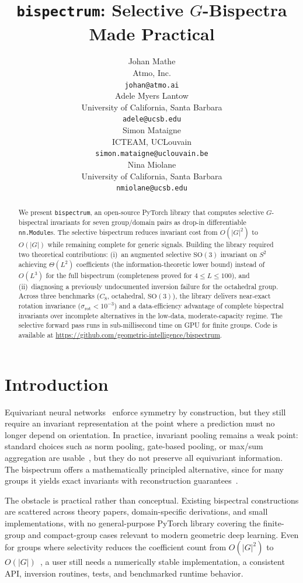 \documentclass{article}
\title{\texttt{bispectrum}: Selective $G$-Bispectra Made Practical}
\author{%
  Johan Mathe \\
  Atmo, Inc. \\
  \texttt{johan@atmo.ai} \\
  \And
  Adele Myers Lantow \\
  University of California, Santa Barbara \\
  \texttt{adele@ucsb.edu} \\
  \And
  Simon Mataigne \\
  ICTEAM, UCLouvain \\
  \texttt{simon.mataigne@uclouvain.be} \\
  \And
  Nina Miolane \\
  University of California, Santa Barbara \\
  \texttt{nmiolane@ucsb.edu} \\
}
\theoremstyle{definition}
\theoremstyle{remark}
\newcommand{\SO}{\mathrm{SO}}
\theoremstyle{definition}
\begin{document}
\maketitle

\begin{abstract}
We present \texttt{bispectrum}, an open-source PyTorch library that computes
selective $G$-bispectral invariants for seven group/domain pairs as
drop-in differentiable \texttt{nn.Module}s.
The selective bispectrum reduces invariant cost from $O(|G|^2)$ to $O(|G|)$
while remaining complete for generic signals.
Building the library required two theoretical contributions:
(i)~an augmented selective $\SO(3)$ invariant on $S^2$ achieving
$\Theta(L^2)$ coefficients (the information-theoretic lower
bound) instead of $O(L^3)$ for the full bispectrum
(completeness proved for $4 \le L \le 100$), and
(ii)~diagnosing a previously undocumented inversion failure for the
octahedral group.
Across three benchmarks ($C_8$, octahedral, $\SO(3)$), the library
delivers near-exact rotation invariance
($\sigma_{\mathrm{rot}} < 10^{-3}$) and a data-efficiency advantage of
complete bispectral invariants over incomplete alternatives in the
low-data, moderate-capacity regime.
The selective forward pass runs in sub-millisecond time on GPU for finite
groups. Code is available at \url{https://github.com/geometric-intelligence/bispectrum}.
\end{abstract}
\section{Introduction}
\label{sec:intro}

Equivariant neural networks~\citep{cohen2016group, weiler2019general} enforce
symmetry by construction, but they still require an invariant representation at
the point where a prediction must no longer depend on orientation. In practice,
invariant pooling remains a weak point: standard choices such as norm pooling,
gate-based pooling, or max/sum aggregation are
usable~\citep{weiler2019general}, but they do not preserve all equivariant
information. The bispectrum offers a mathematically principled alternative,
since for many groups it yields exact invariants with reconstruction
guarantees~\citep{kakarala2012bispectrum}.

The obstacle is practical rather than conceptual. Existing bispectral
constructions are scattered across theory papers, domain-specific derivations,
and small implementations, with no general-purpose PyTorch library covering the
finite-group and compact-group cases relevant to modern geometric deep learning.
Even for groups where selectivity reduces the coefficient count from
$O(|G|^2)$ to $O(|G|)$~\citep{mataigne2024selective}, a user still needs a numerically stable implementation,
a consistent API, inversion routines, tests, and benchmarked runtime behavior.
\end{document}
